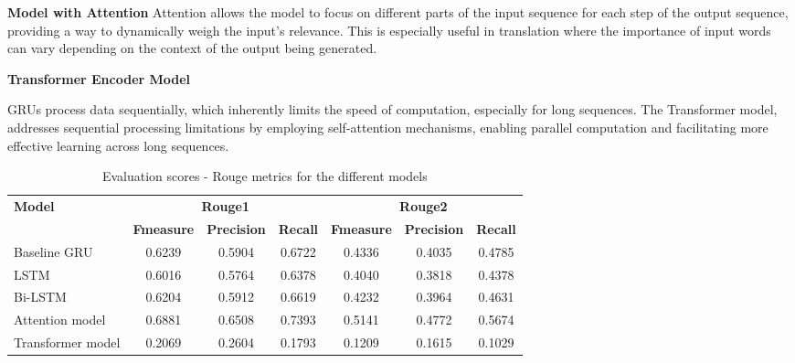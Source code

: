 \documentclass{article}
\begin{document}

\textbf{Model with Attention}
Attention allows the model to focus on different parts of the input sequence for each step of the output sequence, providing a way to dynamically weigh the input's relevance. This is especially useful in translation where the importance of input words can vary depending on the context of the output being generated. 



\textbf{Transformer Encoder Model}

GRUs process data sequentially, which inherently limits the speed of computation, especially for long sequences. The Transformer model, addresses sequential processing limitations by employing self-attention mechanisms, enabling parallel computation and facilitating more effective learning across long sequences.

\begin{table}[ht]
    \centering
    \begin{tabular}{lcccccc}
    \hline
    \textbf{Model} & \multicolumn{3}{c}{\textbf{Rouge1}} & \multicolumn{3}{c}{\textbf{Rouge2}} \\
     & \textbf{Fmeasure} & \textbf{Precision} & \textbf{Recall} & \textbf{Fmeasure} & \textbf{Precision} & \textbf{Recall} \\
    \hline
    Baseline GRU & 0.6239 & 0.5904 & 0.6722 & 0.4336 & 0.4035 & 0.4785 \\
    LSTM & 0.6016 & 0.5764 & 0.6378 & 0.4040 & 0.3818 & 0.4378 \\
    Bi-LSTM & 0.6204 & 0.5912 & 0.6619 & 0.4232 & 0.3964 & 0.4631 \\
    Attention model & 0.6881 & 0.6508 & 0.7393 & 0.5141 & 0.4772 & 0.5674 \\
    Transformer model & 0.2069 & 0.2604 & 0.1793 & 0.1209 & 0.1615 & 0.1029 \\
    \hline
    \end{tabular}
    \caption{Evaluation scores - Rouge metrics for the different models}
    \label{table:rouge_scores}
\end{table}
\end{document}
